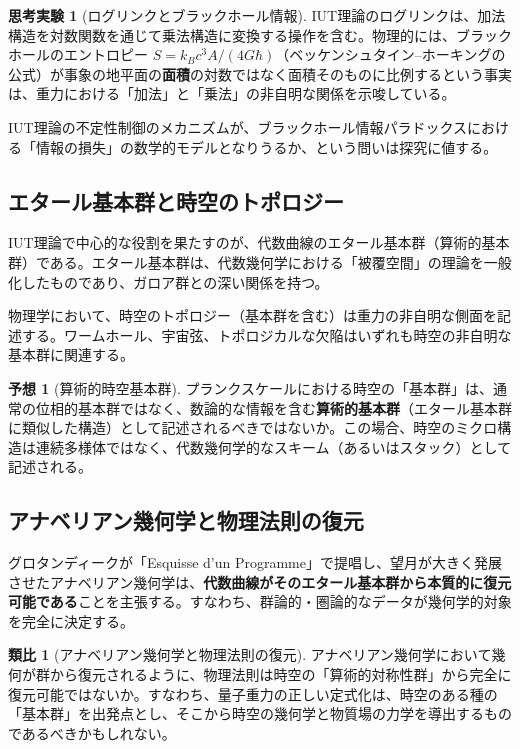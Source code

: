 \documentclass[12pt,a4paper]{ltjsarticle}
\theoremstyle{definition}
\newtheorem{conjecture}[definition]{予想}
\newtheorem{analogy}[definition]{類比}
\newtheorem{thought}[definition]{思考実験}
\begin{document}
\begin{thought}[ログリンクとブラックホール情報]
IUT理論のログリンクは、加法構造を対数関数を通じて乗法構造に変換する操作を含む。物理的には、ブラックホールのエントロピー $S = k_B c^3 A / (4G\hbar)$（ベッケンシュタイン--ホーキングの公式\cite{Bekenstein1973, Hawking1975}）が事象の地平面の\textbf{面積}の対数ではなく面積そのものに比例するという事実は、重力における「加法」と「乗法」の非自明な関係を示唆している。

IUT理論の不定性制御のメカニズムが、ブラックホール情報パラドックスにおける「情報の損失」の数学的モデルとなりうるか、という問いは探究に値する。
\end{thought}

\subsection{エタール基本群と時空のトポロジー}

IUT理論で中心的な役割を果たすのが、代数曲線のエタール基本群（算術的基本群）である。エタール基本群は、代数幾何学における「被覆空間」の理論を一般化したものであり、ガロア群との深い関係を持つ\cite{SGA1}。

物理学において、時空のトポロジー（基本群を含む）は重力の非自明な側面を記述する。ワームホール、宇宙弦、トポロジカルな欠陥はいずれも時空の非自明な基本群に関連する\cite{VisserBook1995}。

\begin{conjecture}[算術的時空基本群]
プランクスケールにおける時空の「基本群」は、通常の位相的基本群ではなく、数論的な情報を含む\textbf{算術的基本群}（エタール基本群に類似した構造）として記述されるべきではないか。この場合、時空のミクロ構造は連続多様体ではなく、代数幾何学的なスキーム（あるいはスタック）として記述される。
\end{conjecture}

\subsection{アナベリアン幾何学と物理法則の復元}

グロタンディークが「Esquisse d'un Programme」\cite{Grothendieck1997}で提唱し、望月が大きく発展させたアナベリアン幾何学\cite{Mochizuki1996}は、\textbf{代数曲線がそのエタール基本群から本質的に復元可能である}ことを主張する。すなわち、群論的・圏論的なデータが幾何学的対象を完全に決定する。

\begin{analogy}[アナベリアン幾何学と物理法則の復元]
アナベリアン幾何学において幾何が群から復元されるように、物理法則は時空の「算術的対称性群」から完全に復元可能ではないか。すなわち、量子重力の正しい定式化は、時空のある種の「基本群」を出発点とし、そこから時空の幾何学と物質場の力学を導出するものであるべきかもしれない。
\end{analogy}
\end{document}
